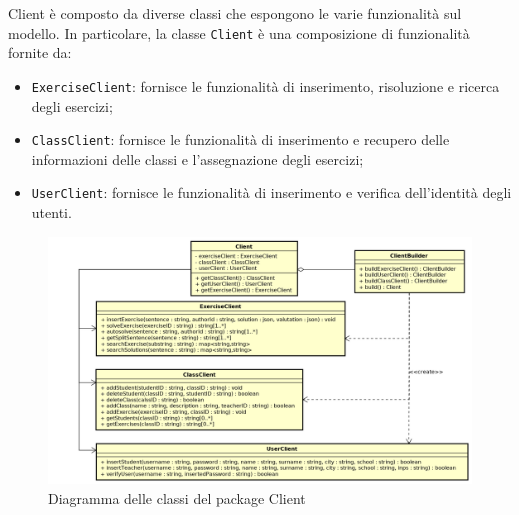 Client è composto da diverse classi che espongono le varie funzionalità sul modello. In particolare, la classe \texttt{Client} è una composizione di funzionalità fornite da:
\begin{itemize}
	\item \texttt{ExerciseClient}: fornisce le funzionalità di inserimento, risoluzione e ricerca degli esercizi;
	\item \texttt{ClassClient}: fornisce le funzionalità di inserimento e recupero delle informazioni delle classi e l'assegnazione degli esercizi;
	\item \texttt{UserClient}: fornisce le funzionalità di inserimento e verifica dell'identità degli utenti.
\end{itemize}

\begin{figure}[ht]
	\includegraphics[scale=0.5]{images/Client.png}
	\caption{Diagramma delle classi del package Client}
\end{figure}